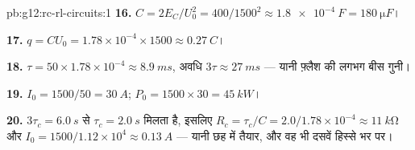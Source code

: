 \begin{solution}{pb:g12:rc-rl-circuits:1}
\textbf{16.} $C = 2E_C/U_0^2 = 400/1500^2 \approx \qty{1.8e-4}{F} =
\qty{180}{\micro F}$।

\textbf{17.} $q = CU_0 = 1.78\times10^{-4} \times 1500 \approx
\qty{0.27}{C}$।

\textbf{18.} $\tau = 50 \times 1.78\times10^{-4} \approx \qty{8.9}{ms}$, अवधि $3\tau \approx \qty{27}{ms}$ --- यानी फ़्लैश की लगभग बीस गुनी।

\textbf{19.} $I_0 = 1500/50 = \qty{30}{A}$; $P_0 = 1500 \times 30 = \qty{45}{kW}$।

\textbf{20.} $3\tau_c = \qty{6.0}{s}$ से $\tau_c = \qty{2.0}{s}$ मिलता है, इसलिए $R_c = \tau_c/C = 2.0/1.78\times10^{-4} \approx \qty{11}{k\ohm}$ और $I_0 = 1500/1.12\times10^{4} \approx \qty{0.13}{A}$ --- यानी
छह  में तैयार, और वह भी दसवें हिस्से भर  पर।
\end{solution}
